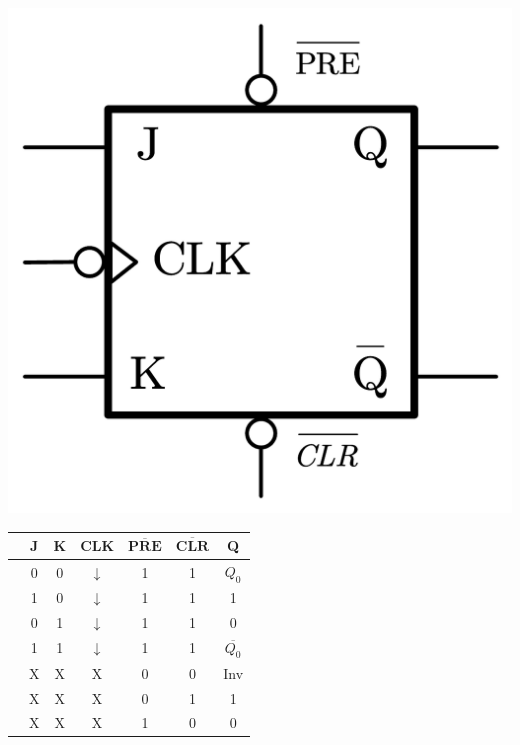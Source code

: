 \vspace{0.7cm}

\begin{minipage}{\textwidth}
    \begin{minipage}[b]{0.49\textwidth}
        \centering
        \includegraphics[scale=0.25]{Graphics/Practice 2/GRAPHICS/LOGIC GATES/JK ASYNCH.pdf}
        \label{fig:JK_Asynch}
    \end{minipage}
    \hfill
    \begin{minipage}[b]{0.49\textwidth}
        \centering
            \begin{tabular}[t]{lcccccc}
                \toprule
                & \textbf{J} & \textbf{K} & \textbf{CLK} & $\overline{\mathbf{PRE}}$ & $\overline{\mathbf{CLR}}$ & \textbf{Q}\\
                \midrule
                & 0 & 0 & $\downarrow$ & 1 & 1 & $Q_0$\\
                & 1 & 0 & $\downarrow$ & 1 & 1 & 1\\
                & 0 & 1 & $\downarrow$ & 1 & 1 & 0\\
                & 1 & 1 & $\downarrow$ & 1 & 1 & $\overline{Q_0}$\\
                \midrule
                & X & X & X & 0 & 0 & Inv\\
                & X & X & X & 0 & 1 & 1\\
                & X & X & X & 1 & 0 & 0\\
                \bottomrule
            \end{tabular}
        \label{table:JK_Asynch_TT}
    \end{minipage}
\end{minipage}\textbf{}

